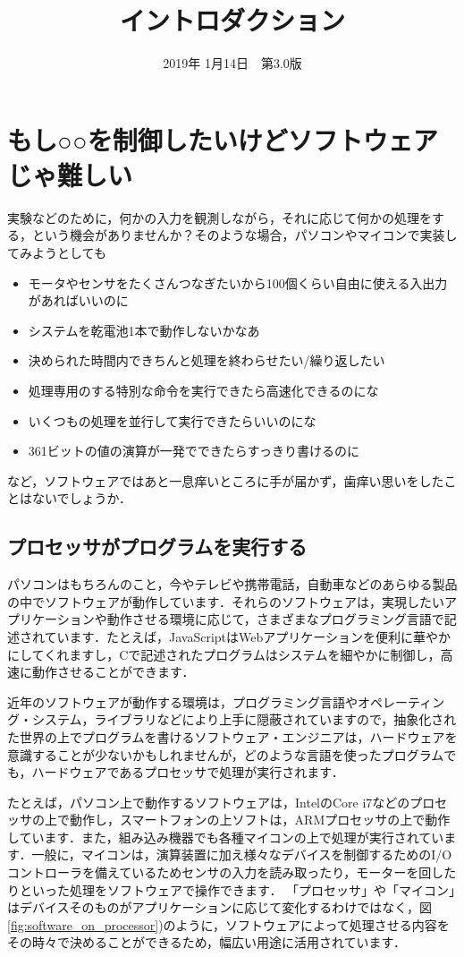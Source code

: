 \documentclass[a4paper,dvipdfmx]{jsarticle}
\begin{document}
\title{イントロダクション}
\author{}
\date{2019年 1月14日~~第3.0版}
\maketitle

\section{もし○○を制御したいけどソフトウェアじゃ難しい}
実験などのために，何かの入力を観測しながら，それに応じて何かの処理をする，という機会がありませんか？そのような場合，パソコンやマイコンで実装してみようとしても
\begin{itemize}
 \item モータやセンサをたくさんつなぎたいから100個くらい自由に使える入出力があればいいのに
 \item システムを乾電池1本で動作しないかなあ
 \item 決められた時間内できちんと処理を終わらせたい/繰り返したい
 \item 処理専用のする特別な命令を実行できたら高速化できるのにな
 \item いくつもの処理を並行して実行できたらいいのにな
 \item 361ビットの値の演算が一発でできたらすっきり書けるのに
\end{itemize}
など，ソフトウェアではあと一息痒いところに手が届かず，歯痒い思いをしたことはないでしょうか．

\subsection{プロセッサがプログラムを実行する}
パソコンはもちろんのこと，今やテレビや携帯電話，自動車などのあらゆる製品の中でソフトウェアが動作しています．それらのソフトウェアは，実現したいアプリケーションや動作させる環境に応じて，さまざまなプログラミング言語で記述されています．たとえば，JavaScriptはWebアプリケーションを便利に華やかにしてくれますし，Cで記述されたプログラムはシステムを細やかに制御し，高速に動作させることができます．

近年のソフトウェアが動作する環境は，プログラミング言語やオペレーティング・システム，ライブラリなどにより上手に隠蔽されていますので，抽象化された世界の上でプログラムを書けるソフトウェア・エンジニアは，ハードウェアを意識することが少ないかもしれませんが，どのような言語を使ったプログラムでも，ハードウェアであるプロセッサで処理が実行されます．

たとえば，パソコン上で動作するソフトウェアは，IntelのCore i7などのプロセッサの上で動作し，スマートフォンの上ソフトは，ARMプロセッサの上で動作しています．また，組み込み機器でも各種マイコンの上で処理が実行されています．一般に，マイコンは，演算装置に加え様々なデバイスを制御するためのI/Oコントローラを備えているためセンサの入力を読み取ったり，モーターを回したりといった処理をソフトウェアで操作できます．
「プロセッサ」や「マイコン」はデバイスそのものがアプリケーションに応じて変化するわけではなく，図\ref{fig:software_on_processor})のように，ソフトウェアによって処理させる内容をその時々で決めることができるため，幅広い用途に活用されています．
\end{document}
